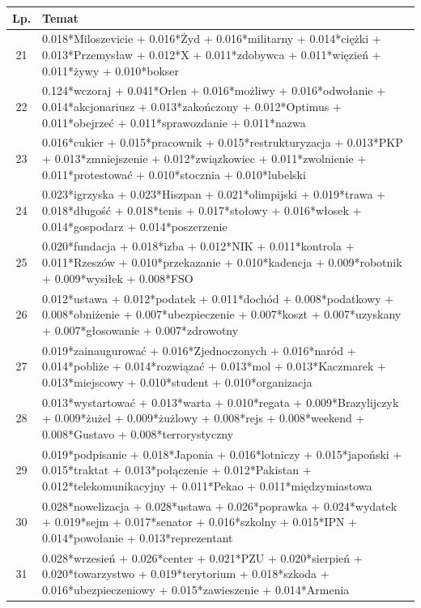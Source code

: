 \documentclass[11pt,a4paper]{article}
\begin{document}
\begin{table}[h]
\begin{tabular}{|c|>{\footnotesize}p{\linewidth}|}
\hline
Lp. & Temat \\\hline

21 & 0.018*Miloszevicie + 0.016*Żyd + 0.016*militarny + 0.014*ciężki + 0.013*Przemysław + 0.012*X + 0.011*zdobywca + 0.011*więzień + 0.011*żywy + 0.010*bokser\\\hline
22 & 0.124*wczoraj + 0.041*Orlen + 0.016*możliwy + 0.016*odwołanie + 0.014*akcjonariusz + 0.013*zakończony + 0.012*Optimus + 0.011*obejrzeć + 0.011*sprawozdanie + 0.011*nazwa\\\hline
23 & 0.016*cukier + 0.015*pracownik + 0.015*restrukturyzacja + 0.013*PKP + 0.013*zmniejszenie + 0.012*związkowiec + 0.011*zwolnienie + 0.011*protestować + 0.010*stocznia + 0.010*lubelski\\\hline
24 & 0.023*igrzyska + 0.023*Hiszpan + 0.021*olimpijski + 0.019*trawa + 0.018*długość + 0.018*tenis + 0.017*stołowy + 0.016*włosek + 0.014*gospodarz + 0.014*poszerzenie\\\hline
25 & 0.020*fundacja + 0.018*izba + 0.012*NIK + 0.011*kontrola + 0.011*Rzeszów + 0.010*przekazanie + 0.010*kadencja + 0.009*robotnik + 0.009*wysiłek + 0.008*FSO\\\hline
26 & 0.012*ustawa + 0.012*podatek + 0.011*dochód + 0.008*podatkowy + 0.008*obniżenie + 0.007*ubezpieczenie + 0.007*koszt + 0.007*uzyskany + 0.007*głosowanie + 0.007*zdrowotny\\\hline
27 & 0.019*zainaugurować + 0.016*Zjednoczonych + 0.016*naród + 0.014*pobliże + 0.014*rozwiązać + 0.013*mol + 0.013*Kaczmarek + 0.013*miejscowy + 0.010*student + 0.010*organizacja\\\hline
28 & 0.013*wystartować + 0.013*warta + 0.010*regata + 0.009*Brazylijczyk + 0.009*żużel + 0.009*żużlowy + 0.008*rejs + 0.008*weekend + 0.008*Gustavo + 0.008*terrorystyczny\\\hline
29 & 0.019*podpisanie + 0.018*Japonia + 0.016*lotniczy + 0.015*japoński + 0.015*traktat + 0.013*połączenie + 0.012*Pakistan + 0.012*telekomunikacyjny + 0.011*Pekao + 0.011*międzymiastowa\\\hline
30 & 0.028*nowelizacja + 0.028*ustawa + 0.026*poprawka + 0.024*wydatek + 0.019*sejm + 0.017*senator + 0.016*szkolny + 0.015*IPN + 0.014*powołanie + 0.013*reprezentant\\\hline
31 & 0.028*wrzesień + 0.026*center + 0.021*PZU + 0.020*sierpień + 0.020*towarzystwo + 0.019*terytorium + 0.018*szkoda + 0.016*ubezpieczeniowy + 0.015*zawieszenie + 0.014*Armenia\\\hline

\end{tabular}
\end{table}
\end{document}
